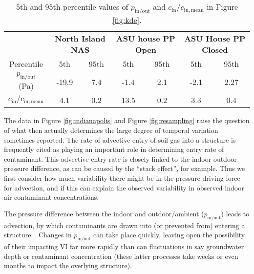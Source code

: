 \documentclass[journal=esthag,manuscript=article]{achemso}
\begin{document}
\begin{table}[htb!]
 \caption{5th and 95th percentile values of $p_\mathrm{in/out}$ and $c_\mathrm{in}/c_\mathrm{in,mean}$ in Figure \ref{fig:kde}.}\label{tbl:percentiles}
 \begin{tabular}{c c c c c c c}
  \toprule
                                     & \multicolumn{2}{c|}{\textbf{North Island NAS}} & \multicolumn{2}{c|}{\textbf{ASU house PP Open}} & \multicolumn{2}{c}{\textbf{ASU House PP Closed}}                      \\
  Percentile                         & 5th                                            & 95th                                            & 5th                                              & 95th & 5th  & 95th \\
  $p_\mathrm{in/out}$ (Pa)           & -19.9                                          & 7.4                                             & -1.4                                             & 2.1  & -2.1 & 2.27 \\
  $c_\mathrm{in}/c_\mathrm{in,mean}$ & 4.1                                            & 0.2                                             & 13.5                                             & 0.2  & 3.3  & 0.4  \\
  \bottomrule
 \end{tabular}
\end{table}

The data in Figure \ref{fig:indianapolis} and Figure \ref{fig:resampling} raise the question of what then actually determines the large degree of temporal variation sometimes reported.
The rate of advective entry of soil gas into a structure is frequently cited as playing an important role in determining entry rate of contaminant.
This advective entry rate is closely linked to the indoor-outdoor pressure difference, as can be caused by the “stack effect”, for example.
Thus we first consider how much variability there might be in the pressure driving force for advection, and if this can explain the observed variability in observed indoor air contaminant concentrations.\par

The pressure difference between the indoor and outdoor/ambient ($p_\mathrm{in/out}$) leads to advection, by which contaminants are drawn into (or prevented from) entering a structure. 
Changes in $p_\mathrm{in/out}$ can take place quickly, leaving open the possibility of their impacting VI far more rapidly than can fluctuations in say groundwater depth or contaminant concentration (these latter processes take weeks or even months to impact the overlying structure).\par
\end{document}
